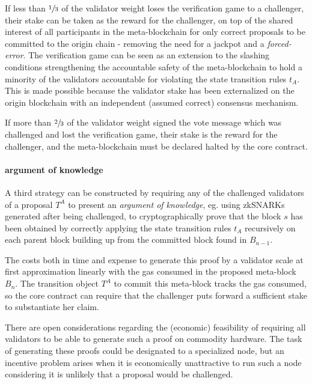 \documentclass[12pt,a4paper]{article}
\begin{document}
If less than $\sfrac{1}{3}$ of the validator weight loses the verification game to a challenger, their stake can be taken as the reward for the challenger, on top of the shared interest of all participants in the meta-blockchain for only correct proposals to be committed to the origin chain - removing the need for a jackpot and a \emph{forced-error}.
The verification game can be seen as an extension to the slashing conditions strengthening the accountable safety of the meta-blockchain to hold a minority of the validators accountable for violating the state transition rules $t_A$.
This is made possible because the validator stake has been externalized on the origin blockchain with an independent (assumed correct) consensus mechanism.

If more than $\sfrac{2}{3}$ of the validator weight signed the vote message which was challenged and lost the verification game, their stake is the reward for the challenger, and the meta-blockchain must be declared halted by the core contract.

\paragraph{argument of knowledge} A third strategy can be constructed by requiring any of the challenged validators of a proposal $T^A$ to present an \emph{argument of knowledge}, eg. using \mbox{zkSNARKs} generated after being challenged, to cryptographically prove that the block $s$ has been obtained by correctly applying the state transition rules $t_A$ recursively on each parent block building up from the committed block found in $B_{n-1}$.

The costs both in time and expense to generate this proof by a validator scale at first approximation linearly with the gas consumed in the proposed meta-block $B_n$.
The transition object $T^A$ to commit this meta-block tracks the gas consumed, so the core contract can require that the challenger puts forward a sufficient stake to substantiate her claim.

There are open considerations regarding the (economic) feasibility of requiring all validators to be able to generate such a proof on commodity hardware.
The task of generating these proofs could be designated to a specialized node, but an incentive problem arises when it is economically unattractive to run such a node considering it is unlikely that a proposal would be challenged.
\end{document}
